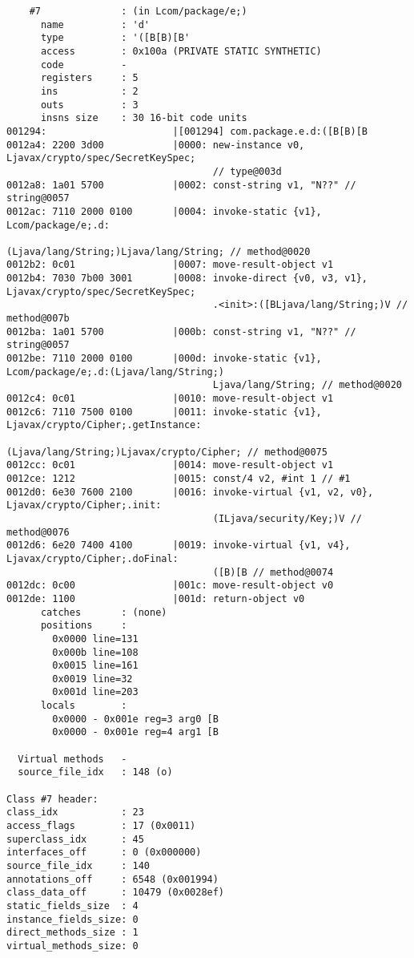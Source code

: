 \begin{lstlisting}
    #7              : (in Lcom/package/e;)
      name          : 'd'
      type          : '([B[B)[B'
      access        : 0x100a (PRIVATE STATIC SYNTHETIC)
      code          -
      registers     : 5
      ins           : 2
      outs          : 3
      insns size    : 30 16-bit code units
001294:                      |[001294] com.package.e.d:([B[B)[B
0012a4: 2200 3d00            |0000: new-instance v0, Ljavax/crypto/spec/SecretKeySpec;
                                    // type@003d
0012a8: 1a01 5700            |0002: const-string v1, "N??" // string@0057
0012ac: 7110 2000 0100       |0004: invoke-static {v1}, Lcom/package/e;.d:
                                    (Ljava/lang/String;)Ljava/lang/String; // method@0020
0012b2: 0c01                 |0007: move-result-object v1
0012b4: 7030 7b00 3001       |0008: invoke-direct {v0, v3, v1}, Ljavax/crypto/spec/SecretKeySpec;
                                    .<init>:([BLjava/lang/String;)V // method@007b
0012ba: 1a01 5700            |000b: const-string v1, "N??" // string@0057
0012be: 7110 2000 0100       |000d: invoke-static {v1}, Lcom/package/e;.d:(Ljava/lang/String;)
                                    Ljava/lang/String; // method@0020
0012c4: 0c01                 |0010: move-result-object v1
0012c6: 7110 7500 0100       |0011: invoke-static {v1}, Ljavax/crypto/Cipher;.getInstance:
                                    (Ljava/lang/String;)Ljavax/crypto/Cipher; // method@0075
0012cc: 0c01                 |0014: move-result-object v1
0012ce: 1212                 |0015: const/4 v2, #int 1 // #1
0012d0: 6e30 7600 2100       |0016: invoke-virtual {v1, v2, v0}, Ljavax/crypto/Cipher;.init:
                                    (ILjava/security/Key;)V // method@0076
0012d6: 6e20 7400 4100       |0019: invoke-virtual {v1, v4}, Ljavax/crypto/Cipher;.doFinal:
                                    ([B)[B // method@0074
0012dc: 0c00                 |001c: move-result-object v0
0012de: 1100                 |001d: return-object v0
      catches       : (none)
      positions     :
        0x0000 line=131
        0x000b line=108
        0x0015 line=161
        0x0019 line=32
        0x001d line=203
      locals        :
        0x0000 - 0x001e reg=3 arg0 [B
        0x0000 - 0x001e reg=4 arg1 [B

  Virtual methods   -
  source_file_idx   : 148 (o)

Class #7 header:
class_idx           : 23
access_flags        : 17 (0x0011)
superclass_idx      : 45
interfaces_off      : 0 (0x000000)
source_file_idx     : 140
annotations_off     : 6548 (0x001994)
class_data_off      : 10479 (0x0028ef)
static_fields_size  : 4
instance_fields_size: 0
direct_methods_size : 1
virtual_methods_size: 0


\end{lstlisting}
